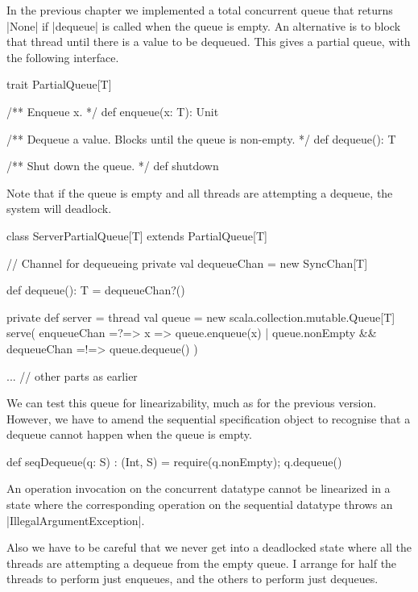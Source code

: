 

\begin{slide}

In the previous chapter we implemented a total concurrent queue that returns
|None| if |dequeue| is called when the queue is empty.  
%
An alternative is to block that thread until there is a value to be dequeued.
This gives a partial queue, with the following interface.

\begin{scala}
trait PartialQueue[T]{
  /** Enqueue x. */
  def enqueue(x: T): Unit

  /** Dequeue a value.  Blocks until the queue is non-empty. */
  def dequeue(): T

  /** Shut down the queue. */
  def shutdown
}
\end{scala}
Note that if the queue is empty and all threads are attempting a dequeue, the
system will deadlock. 
\end{slide}


\begin{slide}

\begin{scala}
class ServerPartialQueue[T] extends PartialQueue[T]{
  // Channel for dequeueing
  private val dequeueChan = new SyncChan[T]

  def dequeue(): T = dequeueChan?()

  private def server = thread{
    val queue = new scala.collection.mutable.Queue[T]
    serve(
      enqueueChan =?=> { x => queue.enqueue(x) }
      | queue.nonEmpty && dequeueChan =!=> queue.dequeue()
    )
  }

  ... // other parts as earlier
}
\end{scala}
\end{slide}


\begin{slide}

We can test this queue for linearizability, much as for the previous version.
However, we have to amend the sequential specification object to recognise
that a dequeue cannot happen when the queue is empty. 
\begin{scala}
  def seqDequeue(q: S) : (Int, S) = {
    require(q.nonEmpty); q.dequeue()
  }
\end{scala}
An operation invocation on the concurrent datatype cannot be linearized in a
state where the corresponding operation on the sequential datatype throws an
|IllegalArgumentException|.

Also we have to be careful that we never get into a deadlocked state where all
the threads are attempting a dequeue from the empty queue.  I arrange for half
the threads to perform just enqueues, and the others to perform just dequeues.  
\end{slide}

